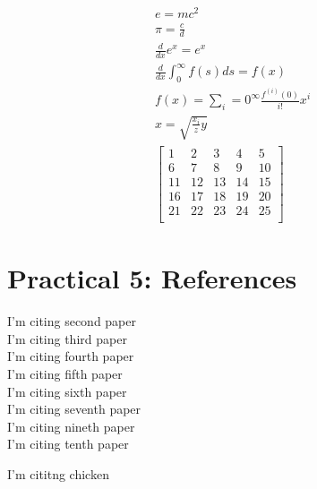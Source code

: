 \documentclass[a4paper, 12pt]{report}
\begin{document}
\begin{eqnarray}
e = mc^2\\
\pi = \frac{c}{d}\\
\frac{d}{dx}e^x = e^x\\
\frac{d}{dx}\int_0^\infty f(s)ds = f(x)\\
f(x) = \sum_i = 0^\infty \frac{f^{(i)}(0)}{i!}x^i\\
x = \sqrt{\frac{x_i}{z}y}\\
\left[
	\begin{matrix}
		1 & 2 & 3 & 4 & 5\\
		6 & 7 & 8 & 9 & 10\\
		11 & 12 & 13 & 14 & 15\\
		16 & 17 & 18 & 19 & 20\\
		21 & 22 & 23 & 24 & 25\\
	\end{matrix}
\right]
\end{eqnarray}


\setcounter{chapter}{5}
\chapter*{Practical 5: References}


I'm citing second paper \cite{liang2016cnn}\\

I'm citing third paper \cite{dong2017evaluations}\\

I'm citing fourth paper \cite{hung2017applying}\\

I'm citing fifth paper \cite{bibin2017malaria}\\

I'm citing sixth paper \cite{anantharaman2018utilizing}\\

I'm citing seventh paper \cite{fuhad2020deep}\\

I'm citing nineth paper \cite{chato2017machine}\\ %

I'm citing tenth paper \cite[p. 215]{liang2014deep}\\ %

\cite{Birdetal2001, liang2014deep, fuhad2020deep}

I'm cititng chicken \cite{wikichicken}

\nocite{Birdetal2001} %
\nocite{chang2017method}


% 
% 
% 

\end{document}
